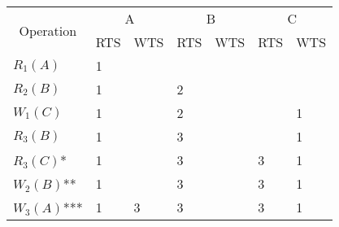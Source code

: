 \documentclass{article}
\begin{document}
\begin{enumerate}
\begin{enumerate}
        \begin{center}
            \begin{longtable}{|p{2cm}|p{1.5cm}|p{1.5cm}|p{1.5cm}|p{1.5cm}|p{1.5cm}|p{1.5cm}|}
                \hline
                \multicolumn{1}{|c|}{\multirow{2}{*}{Operation}} & \multicolumn{2}{c|}{A} & \multicolumn{2}{c|}{B} & \multicolumn{2}{c|}{C} \\
                \multicolumn{1}{|c|}{} & \multicolumn{1}{c}{RTS} & \multicolumn{1}{c|}{WTS} & \multicolumn{1}{c}{RTS} & \multicolumn{1}{c|}{WTS} & \multicolumn{1}{c}{RTS} & \multicolumn{1}{c|}{WTS} \\ 
                \hline
                \multirow{2}{*}{$R_1(A)$} & \multirow{2}{*}{1} & \multirow{2}{*}{} & \multirow{2}{*}{} & \multirow{2}{*}{} & \multirow{2}{*}{} & \multirow{2}{*}{} \\
                 & & & & & & \\
                \hline 
                \multirow{2}{*}{$R_2(B)$} & \multirow{2}{*}{1} & \multirow{2}{*}{} & \multirow{2}{*}{2} & \multirow{2}{*}{} & \multirow{2}{*}{} & \multirow{2}{*}{} \\
                 & & & & & & \\
                \hline 
                \multirow{2}{*}{$W_1(C)$} & \multirow{2}{*}{1} & \multirow{2}{*}{} & \multirow{2}{*}{2} & \multirow{2}{*}{} & \multirow{2}{*}{} & \multirow{2}{*}{1} \\
                 & & & & & & \\
                \hline 
                \multirow{2}{*}{$R_3(B)$} & \multirow{2}{*}{1} & \multirow{2}{*}{} & \multirow{2}{*}{3} & \multirow{2}{*}{} & \multirow{2}{*}{} & \multirow{2}{*}{1} \\
                 & & & & & & \\
                \hline 
                \multirow{2}{*}{$R_3(C)$*} & \multirow{2}{*}{1} & \multirow{2}{*}{} & \multirow{2}{*}{3} & \multirow{2}{*}{} & \multirow{2}{*}{3} & \multirow{2}{*}{1} \\
                 & & & & & & \\
                \hline 
                \multirow{2}{*}{$W_2(B)$**} & \multirow{2}{*}{1} & \multirow{2}{*}{} & \multirow{2}{*}{3} & \multirow{2}{*}{} & \multirow{2}{*}{3} & \multirow{2}{*}{1} \\
                 & & & & & & \\
                \hline 
                \multirow{2}{*}{$W_3(A)$***} & \multirow{2}{*}{1} & \multirow{2}{*}{3} & \multirow{2}{*}{3} & \multirow{2}{*}{} & \multirow{2}{*}{3} & \multirow{2}{*}{1} \\

\end{longtable}
\end{center}
\end{enumerate}
\end{enumerate}
\end{document}
